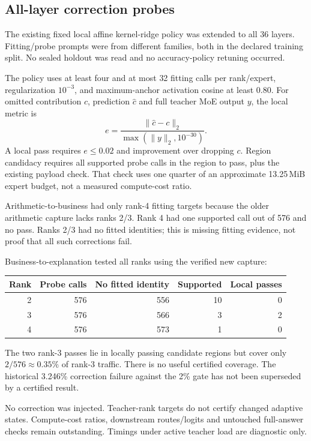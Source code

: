\subsection{All-layer correction probes}
The existing fixed local affine kernel-ridge policy was extended to all
36 layers. Fitting/probe prompts were from different families, both in the
declared training split. No sealed holdout was read and no accuracy-policy
retuning occurred.

The policy uses at least four and at most 32 fitting calls per rank/expert,
regularization $10^{-3}$, and maximum-anchor activation cosine at least
0.80. For omitted contribution $c$, prediction $\widehat c$ and full teacher
MoE output $y$, the local metric is
\[
 e=\frac{\lVert\widehat c-c\rVert_2}{\max(\lVert y\rVert_2,10^{-30})}.
\]
A local pass requires $e\leq0.02$ and improvement over dropping $c$.
Region candidacy requires all supported probe calls in the region to pass,
plus the existing payload check. That check uses one quarter of an
approximate 13.25\,MiB expert budget, not a measured compute-cost ratio.

Arithmetic-to-business had only rank-4 fitting targets because the older
arithmetic capture lacks ranks 2/3. Rank 4 had one supported call out of
576 and no pass. Ranks 2/3 had no fitted identities; this is missing fitting
evidence, not proof that all such corrections fail.

Business-to-explanation tested all ranks using the verified new capture:
\begin{center}
\begin{tabular}{rrrrr}
\toprule
Rank & Probe calls & No fitted identity & Supported & Local passes \\
\midrule
2 & 576 & 556 & 10 & 0 \\
3 & 576 & 566 & 3 & 2 \\
4 & 576 & 573 & 1 & 0 \\
\bottomrule
\end{tabular}
\end{center}
The two rank-3 passes lie in locally passing candidate regions but cover
only $2/576\approx0.35\%$ of rank-3 traffic. There is no useful certified
coverage. The historical 3.246\% correction failure against the 2\% gate
has not been superseded by a certified result.

No correction was injected. Teacher-rank targets do not certify changed
adaptive states. Compute-cost ratios, downstream routes/logits and untouched
full-answer checks remain outstanding. Timings under active teacher load
are diagnostic only.

